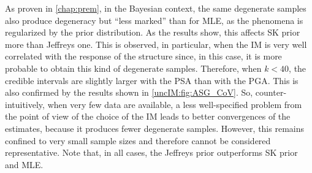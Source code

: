     As proven in \cref{chap:prem}, in the Bayesian context, the same degenerate samples also produce degeneracy but ``less marked'' than for MLE, as the phenomena is regularized by the prior distribution. %
    As the results show, this affects SK prior more than Jeffreys one. This is observed, in particular, when the IM is very well correlated with the response of the structure since, in this case, it is more probable to obtain this kind of degenerate samples. Therefore, when $k < 40$, the credible intervals are slightly larger with the PSA than with the PGA. This is also confirmed by the results shown in \cref{uncIM:fig:ASG_CoV}. So, counter-intuitively, when very few data are available, a less well-specified problem from the point of view of the choice of the IM leads to better convergences of the estimates, because it produces fewer degenerate samples. However, this remains confined to very small sample sizes and therefore cannot be considered representative. Note that, in all cases, the Jeffreys prior outperforms SK prior and MLE.



